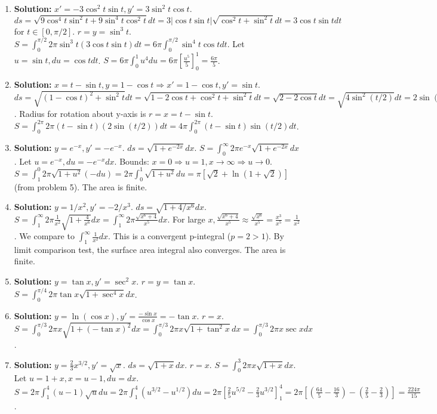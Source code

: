 \documentclass{article}
\begin{document}
\begin{enumerate}
\item \textbf{Solution:} $x'=-3\cos^2 t \sin t, y'=3\sin^2 t \cos t$. $ds=\sqrt{9\cos^4t\sin^2t+9\sin^4t\cos^2t}dt=3|\cos t\sin t|\sqrt{\cos^2t+\sin^2t}dt=3\cos t\sin t dt$ for $t\in[0,\pi/2]$.
$r=y=\sin^3 t$. $S=\int_0^{\pi/2} 2\pi \sin^3 t (3\cos t\sin t)dt=6\pi\int_0^{\pi/2} \sin^4 t \cos t dt$.
Let $u=\sin t, du=\cos t dt$. $S=6\pi\int_0^1 u^4 du=6\pi[\frac{u^5}{5}]_0^1 = \frac{6\pi}{5}$.

\item \textbf{Solution:} $x=t-\sin t, y=1-\cos t \Rightarrow x'=1-\cos t, y'=\sin t$. $ds=\sqrt{(1-\cos t)^2+\sin^2t}dt=\sqrt{1-2\cos t+\cos^2t+\sin^2t}dt=\sqrt{2-2\cos t}dt=\sqrt{4\sin^2(t/2)}dt=2\sin(t/2)dt$.
Radius for rotation about y-axis is $r=x=t-\sin t$.
$S=\int_0^{2\pi} 2\pi(t-\sin t)(2\sin(t/2))dt = 4\pi\int_0^{2\pi}(t-\sin t)\sin(t/2)dt$.

\item \textbf{Solution:} $y=e^{-x}, y'=-e^{-x}$. $ds=\sqrt{1+e^{-2x}}dx$. $S=\int_0^\infty 2\pi e^{-x}\sqrt{1+e^{-2x}}dx$.
Let $u=e^{-x}, du=-e^{-x}dx$. Bounds: $x=0\Rightarrow u=1, x\to\infty\Rightarrow u\to 0$.
$S=\int_1^0 2\pi\sqrt{1+u^2}(-du) = 2\pi\int_0^1 \sqrt{1+u^2}du = \pi[\sqrt{2}+\ln(1+\sqrt{2})]$ (from problem 5). The area is finite.

\item \textbf{Solution:} $y=1/x^2, y'=-2/x^3$. $ds=\sqrt{1+4/x^6}dx$. $S=\int_1^\infty 2\pi \frac{1}{x^2}\sqrt{1+\frac{4}{x^6}}dx = \int_1^\infty 2\pi \frac{\sqrt{x^6+4}}{x^5}dx$.
For large $x, \frac{\sqrt{x^6+4}}{x^5} \approx \frac{\sqrt{x^6}}{x^5}=\frac{x^3}{x^5}=\frac{1}{x^2}$.
We compare to $\int_1^\infty \frac{1}{x^2}dx$. This is a convergent p-integral ($p=2>1$). By limit comparison test, the surface area integral also converges. The area is finite.

\item \textbf{Solution:} $y=\tan x, y'=\sec^2 x$. $r=y=\tan x$.
$S=\int_0^{\pi/4} 2\pi \tan x \sqrt{1+\sec^4 x} dx$.

\item \textbf{Solution:} $y=\ln(\cos x), y'=\frac{-\sin x}{\cos x}=-\tan x$. $r=x$.
$S=\int_0^{\pi/3} 2\pi x \sqrt{1+(-\tan x)^2} dx = \int_0^{\pi/3} 2\pi x \sqrt{1+\tan^2 x} dx = \int_0^{\pi/3} 2\pi x \sec x dx$.

\item \textbf{Solution:} $y=\frac{2}{3}x^{3/2}, y'=\sqrt{x}$. $ds=\sqrt{1+x}dx$. $r=x$.
$S=\int_0^3 2\pi x \sqrt{1+x}dx$. Let $u=1+x, x=u-1, du=dx$.
$S=2\pi\int_1^4 (u-1)\sqrt{u}du = 2\pi\int_1^4(u^{3/2}-u^{1/2})du=2\pi[\frac{2}{5}u^{5/2}-\frac{2}{3}u^{3/2}]_1^4 = 2\pi[(\frac{64}{5}-\frac{16}{3})-(\frac{2}{5}-\frac{2}{3})] = \frac{224\pi}{15}$.


\end{enumerate}
\end{document}
